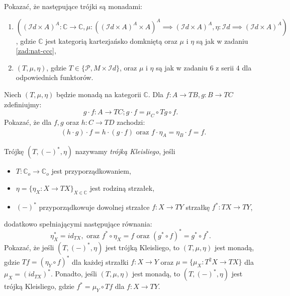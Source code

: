 \begin{zadanie}\label{zad:monady}
Pokazać, że następujące trójki są monadami:
\begin{enumerate}
  \item 
    $((\mathcal{I}d\times A)^A:\mathbb{C}\to \mathbb{C}, 
    \mu: \left ((\mathcal{I}d\times A)^A \times A\right)^A\implies (\mathcal{I}d\times A)^A, 
    \eta: \mathcal{I}d\implies (\mathcal{I}d\times A)^A)
    $, 
    gdzie $\mathbb{C}$ jest kategorią kartezjańsko domkniętą oraz $\mu$ i $\eta$ są jak w zadaniu \ref{zad:nat-ccc},  
  \item $(T, \mu, \eta)$, gdzie $T\in \{\mathcal{P}, M\times \mathcal{I}d\}$, oraz 
      $\mu$ i $\eta$ są jak w zadaniu $6$ z serii $4$ dla odpowiednich funktorów. 
   
\end{enumerate}
\end{zadanie}


\begin{zadanie}\label{zad:kleisli-sklad}
  Niech $(T,\mu,\eta)$ będzie monadą na kategorii $\mathbb{C}$. Dla $f:A\to TB, g:B\to TC$ zdefiniujmy:
  $$ g \cdot f :A\to TC; g\cdot f = \mu_C \circ Tg \circ f .$$ 
  Pokazać, że dla $f,g$ oraz $h:C\to TD$ zachodzi:
  \begin{align*}
    & (h\cdot g)\cdot f = h\cdot (g\cdot f) \text{ oraz } f\cdot \eta_A = \eta_B\cdot f = f.  
  \end{align*}
\end{zadanie}

\begin{zadanie}
 Trójkę $(T,(-)^\ast, \eta)$ nazywamy \emph{trójką Kleisliego}, jeśli
 \begin{itemize}
   \item $T:\mathbb{C}_o\to \mathbb{C}_o$ jest przyporządkowaniem,
   \item $\eta= \{\eta_X:X\to TX\}_{X\in \mathbb{C}}$ jest rodziną strzałek,
   \item $(-)^\ast$ przyporządkowuje dowolnej strzałce $f:X\to TY$ strzałkę $f^\ast :TX\to TY$, 
  \end{itemize}
 dodatkowo spełniającymi następujące równania:
 \[ 
   \eta_X^\ast = id_{TX}, \text{ oraz } f^\ast \circ \eta_X = f \text{ oraz } 
    (g^\ast \circ f)^\ast = g^\ast \circ f^\ast.
 \]
 Pokazać, że jeśli $(T, (-)^\ast, \eta)$ jest trójką Kleisliego, to $(T,\mu,\eta)$ jest monadą, gdzie $Tf = (\eta_Y\circ f)^\ast$ 
 dla każdej strzałki $f:X\to Y$ oraz
 $\mu = \{\mu_X:T^2X\to TX\}$ dla $\mu_X = (id_{TX})^\ast$. 
 Ponadto, jeśli $(T,\mu, \eta)$ jest monadą, 
 to $(T,(-)^\ast, \eta)$ jest trójką Kleisliego, gdzie $f^\ast = \mu_Y \circ Tf$ dla $f:X\to TY$. 
\end{zadanie} 